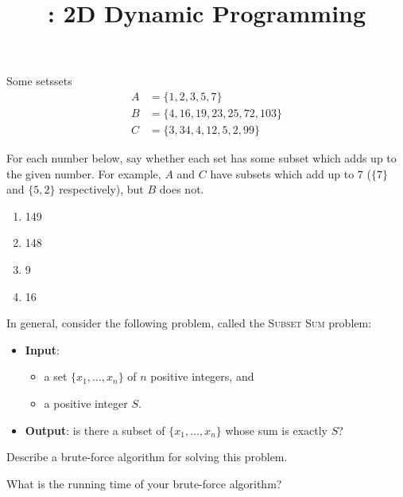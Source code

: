 \documentclass{tufte-handout}
\title{\thecourse: 2D Dynamic Programming}
\date{}
\begin{document}
\maketitle

\begin{model*}{Some sets}{sets}
  \begin{align*}
    A &= \{ 1, 2, 3, 5, 7 \} \\
    B &= \{ 4, 16, 19, 23, 25, 72, 103 \} \\
    C &= \{ 3, 34, 4, 12, 5, 2, 99 \}
  \end{align*}
\end{model*}

\begin{questions}
\item For each number below, say whether each set has some subset
  which adds up to the given number.  For example, $A$ and $C$ have
  subsets which add up to $7$ ($\{7\}$ and $\{5,2\}$ respectively),
  but $B$ does not.
  \begin{enumerate}[label=(\alph*)]
  \item 149
  \item 148
  \item 9
  \item 16
  \end{enumerate}
\end{questions}

In general, consider the following problem, called the \textsc{Subset Sum}
problem:
\begin{itemize}
\item \textbf{Input}:
  \begin{itemize}
  \item a set $\{x_1, \dots, x_n\}$ of $n$ positive
    integers, and
  \item a positive integer $S$.
  \end{itemize}

\item \textbf{Output}: is there a subset of $\{x_1, \dots, x_n\}$
  whose sum is exactly $S$?
\end{itemize}

\begin{questions}
\item Describe a brute-force algorithm for solving this problem.
\item \label{q:brute} What is the running time of your brute-force algorithm?
\end{questions}
\end{document}
